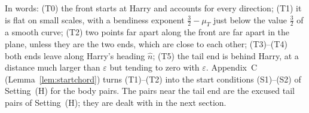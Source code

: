 In words: (T0) the front starts at Harry and accounts for every direction; (T1) it is flat on small scales, with a
bendiness exponent $\frac32-\mu_T$ just below the value $\frac32$ of a smooth curve; (T2) two points far apart along the
front are far apart in the plane, unless they are the two ends, which are close to each other; (T3)--(T4) both ends
leave along Harry's heading $\hat n$; (T5) the tail end is behind Harry, at a distance much larger than $\varepsilon$
but tending to zero with $\varepsilon$. Appendix~C (Lemma~\ref{lem:startchord}) turns (T1)--(T2) into the start
conditions (S1)--(S2) of Setting~(H) for the body pairs. The pairs near the tail end are the excused tail pairs of
Setting~(H); they are dealt with in the next section.

